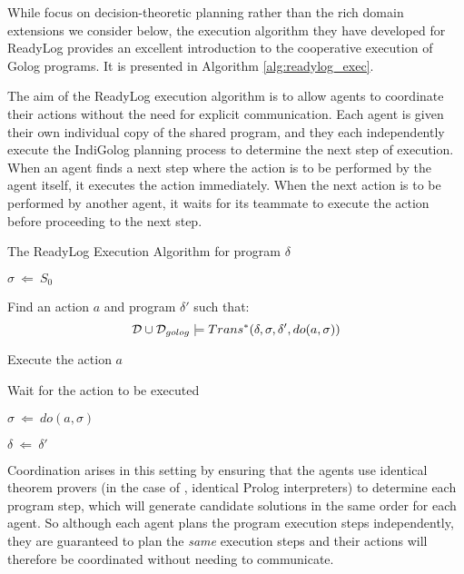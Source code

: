 While \citeauthor{Ferrein2005readylog} focus on decision-theoretic
planning rather than the rich domain extensions we consider below,
the execution algorithm they have developed for ReadyLog provides
an excellent introduction to the cooperative execution of Golog programs.
It is presented in Algorithm \ref{alg:readylog_exec}.

The aim of the ReadyLog execution algorithm is to allow agents to
coordinate their actions without the need for explicit communication.
Each agent is given their own individual copy of the shared program,
and they each independently execute the IndiGolog planning process
to determine the next step of execution. When an agent finds a next
step where the action is to be performed by the agent itself, it executes
the action immediately. When the next action is to be performed by
another agent, it waits for its teammate to execute the action before
proceeding to the next step.

%
\begin{algorithm}[t]
 

\caption{The ReadyLog Execution Algorithm for program $\delta$}


\label{alg:readylog_exec} \begin{algorithmic}

\STATE $\sigma\ \Leftarrow\ S_{0}$


\STATE Find an action $a$ and program $\delta'$ such that:\[
\mathcal{D}\cup\mathcal{D}_{golog}\models Trans^{*}(\delta,\sigma,\delta',do(a,\sigma))\]



\STATE Execute the action $a$

\ELSE

\STATE Wait for the action to be executed

\ENDIF

\STATE $\sigma\ \Leftarrow\ do(a,\sigma)$

\STATE $\delta\ \Leftarrow\ \delta'$

\ENDWHILE

\end{algorithmic} 
\end{algorithm}


Coordination arises in this setting by ensuring that the agents use
identical theorem provers (in the case of \citep{Ferrein2005readylog},
identical Prolog interpreters) to determine each program step, which
will generate candidate solutions in the same order for each agent.
So although each agent plans the program execution steps independently,
they are guaranteed to plan the \emph{same} execution steps and their
actions will therefore be coordinated without needing to communicate.


